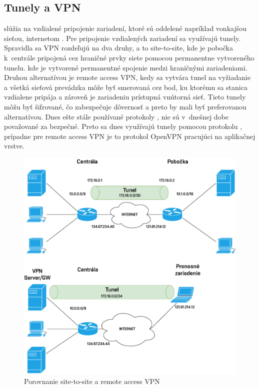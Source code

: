 \subsection{Tunely a VPN}
 slúžia na vzdialené pripojenie zariadení, ktoré sú oddelené napríklad vonkajšou sieťou, internetom \cite{Lammle2013}. Pre pripojenie vzdialených zariadení sa využívajú tunely. Spravidla sa VPN rozdeľujú na dva druhy, a to site-to-site, kde je pobočka k~centrále pripojená cez hraničné prvky siete pomocou permanentne vytvoreného tunelu.  kde je vytvorené permanentné spojenie medzi hraničnými zariadeniami. Druhou alternatívou je remote access VPN, kedy sa vytvára tunel na vyžiadanie a všetká sieťová prevádzka môže byť smerovaná cez bod, ku ktorému sa stanica vzdialene pripája a zároveň je zariadeniu prístupná vnútorná sieť. Tieto tunely môžu byť šifrované, čo zabezpečuje dôvernosť a preto by mali byť preferovanou alternatívou. Dnes ešte stále používané protokoly ,  nie sú v~dnešnej dobe považované za bezpečné. Preto sa dnes využívajú tunely pomocou protokolu , prípadne pre remote access VPN je to protokol OpenVPN pracujúci na aplikačnej vrstve.

\begin{figure}[H]
	\begin{center}
		\includegraphics[scale=0.6]{obrazky/tunnels.pdf}
	\end{center}
	\caption[Porovnanie site-to-site a remote access VPN]{Porovnanie site-to-site a remote access VPN}
	\label{fig:tunnel}
\end{figure} 


